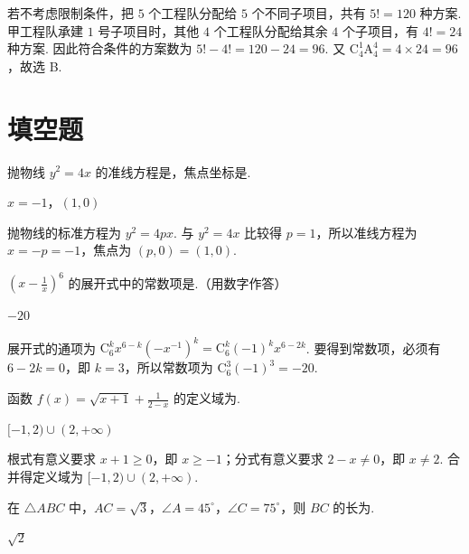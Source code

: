 \begin{solution}
若不考虑限制条件，把 \(5\) 个工程队分配给 \(5\) 个不同子项目，共有 \(5!=120\) 种方案. 甲工程队承建 \(1\) 号子项目时，其他 \(4\) 个工程队分配给其余 \(4\) 个子项目，有 \(4!=24\) 种方案. 因此符合条件的方案数为 \(5!-4!=120-24=96\). 又 \(\mathrm C_4^1\mathrm A_4^4=4\times24=96\)，故选 B.
\end{solution}

\section{填空题}
\begin{problem}
抛物线 \(y^2=4x\) 的准线方程是\fillinblank{}，焦点坐标是\fillinblank{}.
\begin{answer}
\(x=-1\)，\((1,0)\)
\end{answer}
\end{problem}

\begin{solution}
抛物线的标准方程为 \(y^2=4px\). 与 \(y^2=4x\) 比较得 \(p=1\)，所以准线方程为 \(x=-p=-1\)，焦点为 \((p,0)=(1,0)\).
\end{solution}

\begin{problem}
\(\left(x-\frac{1}{x}\right)^6\) 的展开式中的常数项是\fillinblank{}.（用数字作答）
\begin{answer}
\(-20\)
\end{answer}
\end{problem}

\begin{solution}
展开式的通项为 \(\mathrm C_6^k x^{6-k}\left(-x^{-1}\right)^k=\mathrm C_6^k(-1)^k x^{6-2k}\). 要得到常数项，必须有 \(6-2k=0\)，即 \(k=3\)，所以常数项为 \(\mathrm C_6^3(-1)^3=-20\).
\end{solution}

\begin{problem}
函数 \(f(x)=\sqrt{x+1}+\frac{1}{2-x}\) 的定义域为\fillinblank{}.
\begin{answer}
\([-1,2)\cup(2,+\infty)\)
\end{answer}
\end{problem}

\begin{solution}
根式有意义要求 \(x+1\geqslant0\)，即 \(x\geqslant-1\)；分式有意义要求 \(2-x\neq0\)，即 \(x\neq2\). 合并得定义域为 \([-1,2)\cup(2,+\infty)\).
\end{solution}

\begin{problem}
在 \(\triangle ABC\) 中，\(AC=\sqrt{3}\)，\(\angle A=45^{\circ}\)，\(\angle C=75^{\circ}\)，则 \(BC\) 的长为\fillinblank{}.
\begin{answer}
\(\sqrt{2}\)
\end{answer}
\end{problem}

